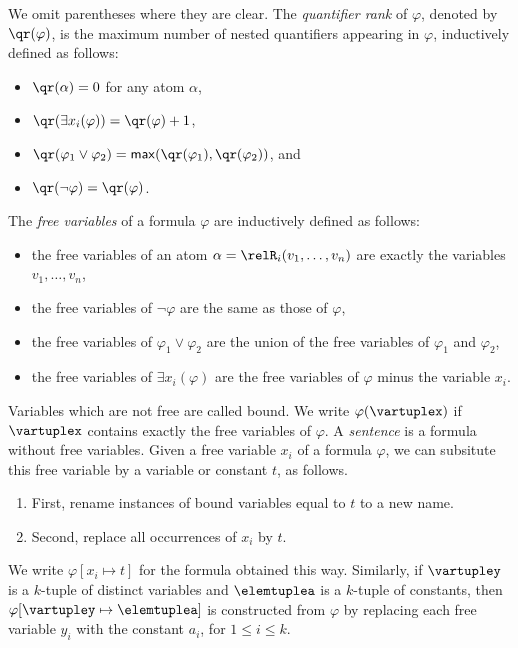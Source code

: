 \noindent
We omit parentheses where they are clear.
The \emph{quantifier rank} of $\varphi$, denoted by $\qr(\varphi)$, is the maximum number of nested quantifiers appearing in $\varphi$, inductively defined as follows:
\begin{itemize}
  \item $\qr(\alpha) = 0$ for any atom $\alpha$,
  \item $\qr(\exists{x_{i}}(\varphi)) = \qr(\varphi) + 1$,
  \item $\qr(\varphi_{1} \lor \varphi_{2}) = \mathsf{max}(\qr(\varphi_{1}), \qr(\varphi_{2}))$, and
  \item $\qr(\neg \varphi)  = \qr(\varphi)$.
\end{itemize}

\begin{samepage}%
\noindent%
The \emph{free variables} of a formula $\varphi$ are inductively defined as follows:
\begin{itemize}
  \item the free variables of an atom $\alpha = \relR_{i}(v_{1}, \ldots, v_{n})$ are exactly the variables $v_{1}, \ldots, v_{n}$,
  \item the free variables of $\neg \varphi$ are the same as those of $\varphi$,
  \item the free variables of $\varphi_{1} \lor \varphi_{2}$ are the union of the free variables of $\varphi_{1}$ and $\varphi_{2}$,
  \item the free variables of $\exists{x_{i}(\varphi)}$ are the free variables of $\varphi$ minus the variable $x_{i}$.
\end{itemize}
\end{samepage}
Variables which are not free are called bound.
We write $\varphi(\vartuplex)$ if $\vartuplex$ contains exactly the free variables of $\varphi$.
A \emph{sentence} is a formula without free variables.
Given a free variable $x_{i}$ of a formula $\varphi$, we can subsitute this free variable by a variable or constant $t$, as follows.
\begin{enumerate}
  \item First, rename instances of bound variables equal to $t$ to a new name.
  \item Second, replace all occurrences of $x_{i}$ by $t$.
\end{enumerate}
We write $\varphi[x_{i} \mapsto t]$ for the formula obtained this way.
Similarly, if $\vartupley$ is a $k$-tuple of distinct variables and $\elemtuplea$ is a $k$-tuple of constants, then $\varphi[\vartupley \mapsto \elemtuplea]$ is constructed from $\varphi$ by replacing each free variable $y_{i}$ with the constant $a_{i}$, for $1 \le i \le k$.

